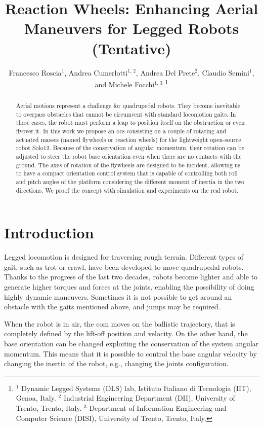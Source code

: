 \documentclass[letterpaper, 10 pt, conference]{ieeeconf}  %
\title{Reaction Wheels: Enhancing Aerial Maneuvers for
	Legged Robots (Tentative)}
\author{
	Francesco Roscia$^{1}$, Andrea Cumerlotti$^{1, \, 2}$, Andrea Del Prete$^{2}$, Claudio Semini$^{1}$, and Michele Focchi$^{1, \, 3}$
	\thanks{$^1$ Dynamic Legged Systems (DLS) lab, Istituto Italiano di Tecnologia (IIT), Genoa, Italy.
		$^2$ Industrial Engineering Department (DII), University of Trento, Trento, Italy.
		$^3$ Department of Information Engineering and Computer Science (DISI), University of Trento, Trento, Italy.
}}
\begin{document}
\maketitle
\thispagestyle{empty}
\pagestyle{empty}

\begin{abstract}%
Aerial motions represent a challenge for quadrupedal robots. They become inevitable to overpass obstacles that cannot be circumvent with standard locomotion gaits. In these cases, the robot must perform a leap to position itself on the obstruction or even flyover it. In this work we propose an \gls{ocs} consisting on a couple of rotating and actuated masses (named flywheels or reaction wheels) for the lightweight open-source robot Solo12. Because of the conservation of angular momentum, their rotation can be adjusted to steer the robot base orientation even when there are no contacts with the ground. The axes of rotation of the flywheels are designed to be incident, allowing us to have a compact orientation control system that is capable of controlling both roll and pitch angles of the platform considering the different moment of inertia in the two directions. We proof the concept with simulation and experiments on the real robot.
\end{abstract}

	 

\section{Introduction}\label{sec:introduction}
Legged locomotion is designed for traversing rough terrain.
Different types of gait, such as trot or crawl, have been developed to move quadrupedal robots. 
Thanks to the progress of the last two decades, robots become lighter and able to generate higher torques and forces at the joints, enabling the possibility of doing highly dynamic maneuvers.
Sometimes it is not possible to get around an obstacle with the gaits mentioned above, and jumps may be required. 

When the robot is in air, the \gls{com} moves on the ballistic trajectory, that is completely defined by the lift-off position and velocity. On the other hand, the base orientation can be changed exploiting the conservation of the system angular momentum. This means that it is possible to control the base angular velocity by changing the inertia of the robot, e.g., changing the joints configuration. 
\end{document}
